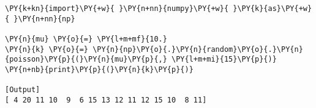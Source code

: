 \begin{Verbatim}[label=\makebox{\href{https://github.com/unipi-physics-labs/statnotes/tree/main/snippy/np.random.poisson.py}{https://github.com/.../np.random.poisson.py}},commandchars=\\\{\}]
\PY{k+kn}{import}\PY{+w}{ }\PY{n+nn}{numpy}\PY{+w}{ }\PY{k}{as}\PY{+w}{ }\PY{n+nn}{np}

\PY{n}{mu} \PY{o}{=} \PY{l+m+mf}{10.}
\PY{n}{k} \PY{o}{=} \PY{n}{np}\PY{o}{.}\PY{n}{random}\PY{o}{.}\PY{n}{poisson}\PY{p}{(}\PY{n}{mu}\PY{p}{,} \PY{l+m+mi}{15}\PY{p}{)}
\PY{n+nb}{print}\PY{p}{(}\PY{n}{k}\PY{p}{)}

[Output]
[ 4 20 11 10  9  6 15 13 12 11 12 15 10  8 11]
\end{Verbatim}
